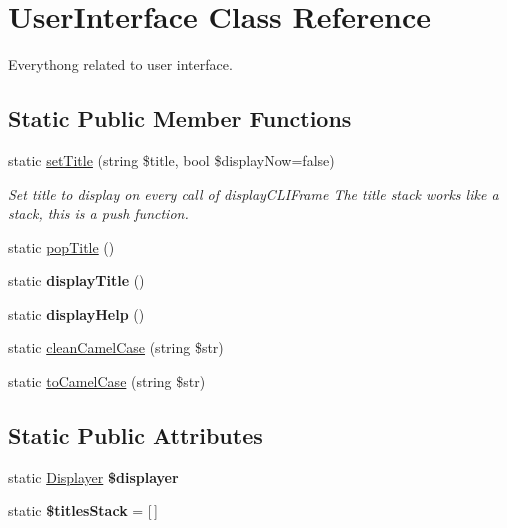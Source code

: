 \hypertarget{classUserInterface}{}\section{User\+Interface Class Reference}
\label{classUserInterface}


Everythong related to user interface.  


\subsection*{Static Public Member Functions}
\begin{DoxyCompactItemize}
\item 
static \hyperlink{classUserInterface_a1ab24d0cc7bedc6e44d1a2814db451de}{set\+Title} (string \$title, bool \$display\+Now=false)
\begin{DoxyCompactList}\small\item\em Set title to display on every call of {\ttfamily display\+C\+L\+I\+Frame} The title stack works like a stack, this is a push function. \end{DoxyCompactList}\item 
static \hyperlink{classUserInterface_adc9951b8ed9d81b31371198ce14d491f}{pop\+Title} ()
\item 
\mbox{\label{classUserInterface_a19711e996c35b83c3221f21682e35b02}} 
static {\bfseries display\+Title} ()
\item 
\mbox{\label{classUserInterface_a3e684ac62312c4fe7eeb4a1ff203ea9d}} 
static {\bfseries display\+Help} ()
\item 
static \hyperlink{classUserInterface_ad13abbe2f3f716e40b2005a8965e6c81}{clean\+Camel\+Case} (string \$str)
\item 
static \hyperlink{classUserInterface_a537f15b5dcfb8f86c2a001bbe41ca8a9}{to\+Camel\+Case} (string \$str)
\end{DoxyCompactItemize}
\subsection*{Static Public Attributes}
\begin{DoxyCompactItemize}
\item 
\mbox{\label{classUserInterface_a4a3b840da421859f787023a7b5cd3f6b}} 
static \hyperlink{classDisplay_1_1Displayer}{Displayer} {\bfseries \$displayer}
\item 
\mbox{\label{classUserInterface_ab7467a6501ff3bb5b67f17a1c17d6fb4}} 
static {\bfseries \$titles\+Stack} = \mbox{[}$\,$\mbox{]}
\end{DoxyCompactItemize}


